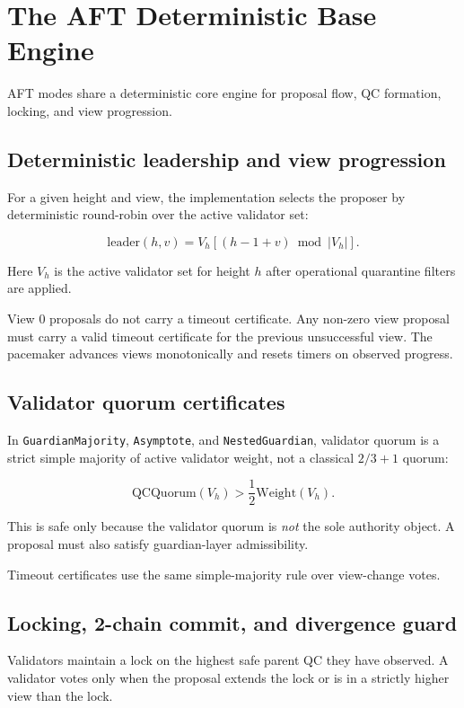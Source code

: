 \documentclass[11pt]{article}
\newcommand{\AFT}{\textsc{AFT}}
\newcommand{\code}[1]{\texttt{#1}}
\begin{document}
\section{The \AFT{} Deterministic Base Engine}

\AFT{} modes share a deterministic core engine for proposal flow, QC
formation, locking, and view progression.

\subsection{Deterministic leadership and view progression}

For a given height and view, the implementation selects the proposer by
deterministic round-robin over the active validator set:

\[
\mathrm{leader}(h, v) = V_h[(h - 1 + v) \bmod |V_h|].
\]

Here \(V_h\) is the active validator set for height \(h\) after operational
quarantine filters are applied.

View \(0\) proposals do not carry a timeout certificate. Any non-zero view
proposal must carry a valid timeout certificate for the previous unsuccessful
view. The pacemaker advances views monotonically and resets timers on observed
progress.

\subsection{Validator quorum certificates}

In \code{GuardianMajority}, \code{Asymptote}, and \code{NestedGuardian},
validator quorum is a strict simple majority of active validator weight, not a
classical \(2/3 + 1\) quorum:

\[
\mathrm{QCQuorum}(V_h) > \frac{1}{2}\mathrm{Weight}(V_h).
\]

This is safe only because the validator quorum is \emph{not} the sole
authority object. A proposal must also satisfy guardian-layer admissibility.

Timeout certificates use the same simple-majority rule over view-change votes.

\subsection{Locking, 2-chain commit, and divergence guard}

Validators maintain a lock on the highest safe parent QC they have observed. A
validator votes only when the proposal extends the lock or is in a strictly
higher view than the lock.
\end{document}
